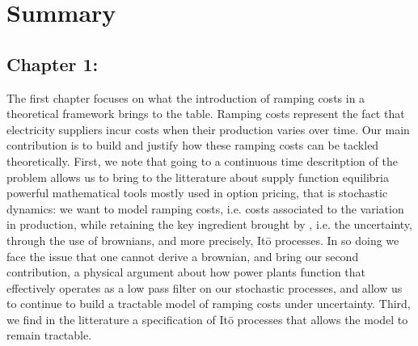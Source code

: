 \chapter*{Summary}
\cleardoublepage

\section*{Chapter 1: }

The first chapter focuses on what the introduction of ramping costs in a theoretical framework brings to the table. Ramping costs represent the fact that electricity suppliers incur costs when their production varies over time. Our main contribution is to build and justify how these ramping costs can be tackled theoretically. First, we note that going to a continuous time descritption of the problem allows us to bring to the litterature about supply function equilibria powerful mathematical tools mostly used in option pricing, that is stochastic dynamics: we want to model ramping costs, i.e. costs associated to the variation in production, while retaining the key ingredient brought by \cite{KM}, i.e. the uncertainty, through the use of brownians, and more precisely, It\={o} processes. In so doing we face the issue that one cannot derive a brownian, and bring our second contribution, a physical argument about how power plants function that effectively operates as a low pass filter on our stochastic processes, and allow us to continue to build a tractable model of ramping costs under uncertainty. Third, we find in the litterature a specification of It\={o} processes that allows the model to remain tractable. \\

